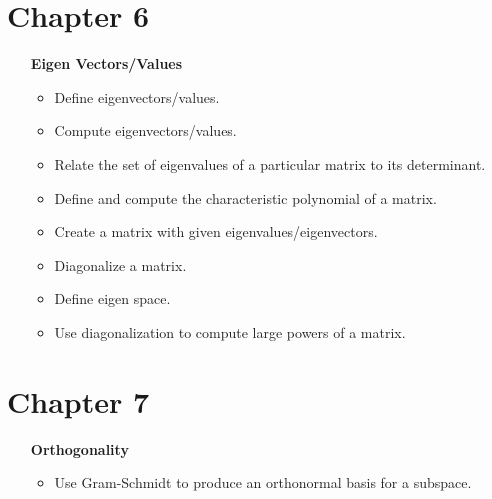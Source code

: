 \documentclass[letter]{article}
\begin{document}
	\section*{Chapter 6}
	\begin{enumerate}
		\item[\bf Eigen Vectors/Values] 
			\begin{itemize}
				\item Define eigenvectors/values.
				\item Compute eigenvectors/values.
				\item Relate the set of eigenvalues of a particular matrix to its determinant.
				\item Define and compute the characteristic polynomial of a matrix.
				\item Create a matrix with given eigenvalues/eigenvectors.
				\item Diagonalize a matrix.
				\item Define eigen space.
				\item Use diagonalization to compute large powers of a matrix.
			\end{itemize}
	\end{enumerate}
	\section*{Chapter 7}
	\begin{enumerate}
		\item[\bf Orthogonality] 
			\begin{itemize}
				\item Use Gram-Schmidt to produce an orthonormal basis for a subspace.
			\end{itemize}
	\end{enumerate}
\end{document}

